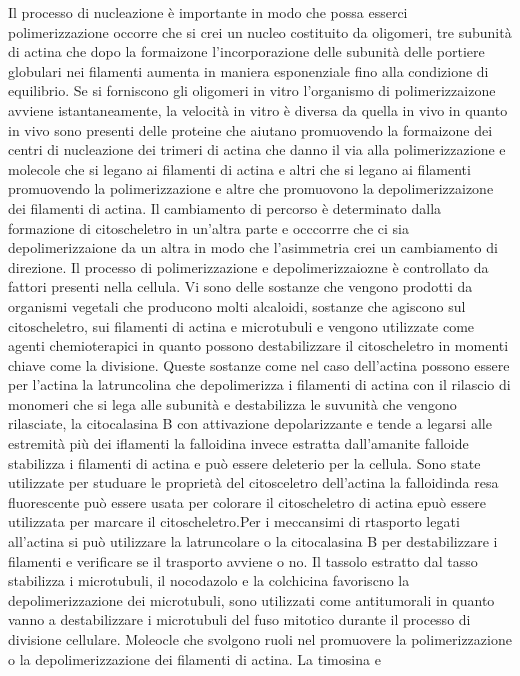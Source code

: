Il processo di nucleazione \`e importante in modo che possa esserci polimerizzazione occorre che si crei un nucleo costituito da oligomeri, tre subunit\`a di actina che dopo la formaizone
l'incorporazione delle subunit\`a delle portiere globulari nei filamenti aumenta in maniera esponenziale fino alla condizione di equilibrio. Se si forniscono gli oligomeri in vitro 
l'organismo di polimerizzaizone avviene istantaneamente, la velocit\`a in vitro \`e diversa da quella in vivo in quanto in vivo sono presenti delle proteine che aiutano promuovendo 
la formaizone dei centri di nucleazione dei trimeri di actina che danno il via alla polimerizzazione e molecole che si legano ai filamenti di actina e altri che si legano ai filamenti
promuovendo la polimerizzazione e altre che promuovono la depolimerizzaizone dei filamenti di actina. Il cambiamento di percorso \`e determinato dalla formazione di citoscheletro in 
un'altra parte e occcorrre che ci sia depolimerizzaione da un altra in modo che l'asimmetria crei un cambiamento di direzione. Il processo di polimerizzazione e depolimerizzaiozne \`e 
controllato da fattori presenti nella cellula. Vi sono delle sostanze che vengono prodotti da organismi vegetali che producono molti alcaloidi, sostanze che agiscono sul citoscheletro,
sui filamenti di actina e microtubuli e vengono utilizzate come agenti chemioterapici in quanto possono destabilizzare il citoscheletro in momenti chiave come la divisione. Queste 
sostanze come nel caso dell'actina possono essere per l'actina la latruncolina che depolimerizza i filamenti di actina con il rilascio di monomeri che si lega alle subunit\`a e 
destabilizza le suvunit\`a che vengono rilasciate, la citocalasina B con attivazione depolarizzante e tende a legarsi alle estremit\`a pi\`u dei iflamenti la falloidina invece estratta
dall'amanite falloide stabilizza i filamenti di actina e pu\`o essere deleterio per la cellula. Sono state utilizzate per studuare le propriet\`a del citosceletro dell'actina la 
falloidinda resa fluorescente pu\`o essere usata per colorare il citoscheletro di actina epu\`o essere utilizzata per marcare il citoscheletro.Per i meccansimi di rtasporto legati 
all'actina si pu\`o utilizzare la latruncolare o la citocalasina B per destabilizzare i filamenti e verificare se il trasporto avviene o no. Il tassolo estratto dal tasso stabilizza
i microtubuli, il nocodazolo e la colchicina favoriscno la depolimerizzazione dei microtubuli, sono utilizzati come antitumorali in quanto vanno a destabilizzare i microtubuli del 
fuso mitotico durante il processo di divisione cellulare. Moleocle che svolgono ruoli nel promuovere la polimerizzazione o la depolimerizzazione dei filamenti di actina. La timosina e 
